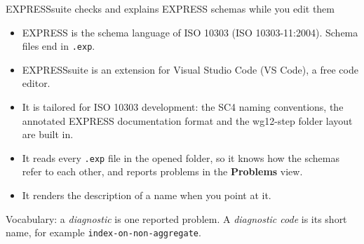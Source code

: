 \documentclass[11pt]{beamer}
\newcommand{\code}[1]{\texttt{#1}}
\begin{document}
\begin{frame}{EXPRESSsuite checks and explains EXPRESS schemas while you edit them}
  \begin{itemize}
    \item EXPRESS is the schema language of ISO 10303 (ISO 10303-11:2004).
      Schema files end in \code{.exp}.
    \item EXPRESSsuite is an extension for Visual Studio Code (VS Code), a free code editor.
    \item It is tailored for ISO 10303 development: the SC4 naming conventions,
      the annotated EXPRESS documentation format and the wg12-step folder layout are built in.
    \item It reads every \code{.exp} file in the opened folder, so it knows how the
      schemas refer to each other, and reports problems in the \textbf{Problems} view.
    \item It renders the description of a name when you point at it.
  \end{itemize}
  \medskip
  \footnotesize\color{sc4grey}
  Vocabulary: a \emph{diagnostic} is one reported problem. A \emph{diagnostic code}
  is its short name, for example \code{index-on-non-aggregate}.
\end{frame}
\end{document}

